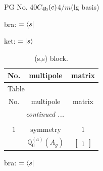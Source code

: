 \documentclass[fleqn,8pt,landscape]{jsarticle}
\begin{document}
\setcounter{MaxMatrixCols}{32}

\renewcommand{\tablename}{Table~}
\renewcommand{\figurename}{Figure~}
\begin{center}
\LARGE
PG No. 40\quad$C_{\rm 4h}(c)$\quad$4/m$\quad[ tetragonal ] (lg basis)
\end{center}
bra: $=\bra{s}$

\noindent
ket: $=\ket{s}$
\renewcommand{\arraystretch}{1.6}
\begin{longtable}{ccc}
\caption{(s,s) block.}
 \\
 \hline \hline
No. & multipole & matrix \\ \hline \endfirsthead

\multicolumn{2}{l}{\tablename\ \thetable{}} \\
 \hline \hline
No. & multipole & matrix \\ \hline \endhead

 \hline \hline
\multicolumn{2}{r}{\footnotesize\it continued ...} \\ \endfoot

 \hline \hline
\multicolumn{2}{r}{} \\ \endlastfoot

$ 1 $ & $ \text{symmetry} $ & $ 1 $ \\
$  $ & $ \mathbb{Q}_{0}^{(a)}(A_{g}) $ & $ \begin{bmatrix} 1 \end{bmatrix} $ \\ \hline
\end{longtable}
bra: $=\bra{s}$
\end{document}
